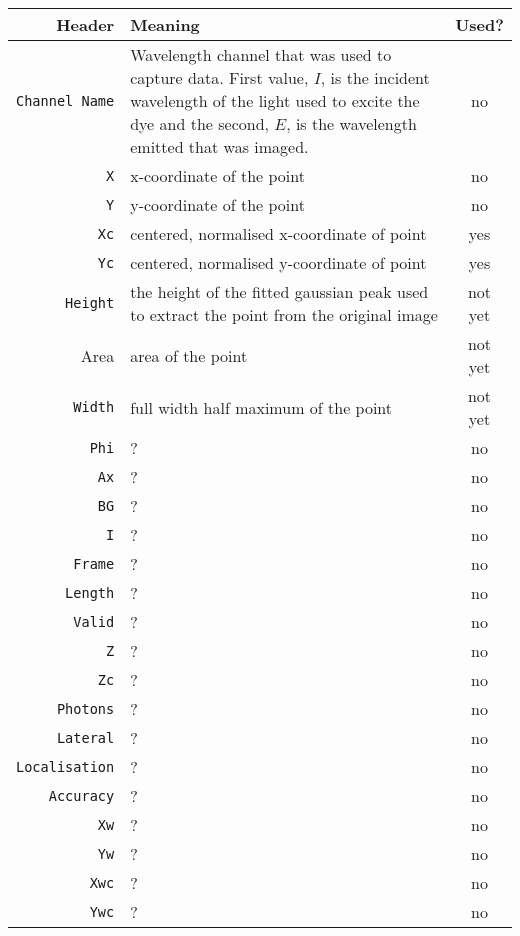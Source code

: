 \begin{center}
	\begin{tabular}{r p{8cm} c}
		\toprule
		Header & Meaning & Used? \\
		\midrule
		\texttt{Channel Name} & Wavelength channel that was used to capture data.
			First value, $I$, is the incident wavelength of the light used to
			excite the dye and the second, $E$, is the wavelength emitted that
			was imaged. & no \\
		\texttt{X} & x-coordinate of the point & no \\
		\texttt{Y} & y-coordinate of the point & no \\
		\texttt{Xc} & centered, normalised x-coordinate of point & yes \\
		\texttt{Yc} & centered, normalised y-coordinate of point & yes \\
		\texttt{Height} & the height of the fitted gaussian peak used to
			extract the point from the original image & not yet \\
		Area & area of the point & not yet \\
		\texttt{Width} & full width half maximum of the point & not yet \\
		\texttt{Phi}          & ? & no \\
		\texttt{Ax}           & ? & no \\
		\texttt{BG}           & ? & no \\
		\texttt{I}            & ? & no \\
		\texttt{Frame}        & ? & no \\
		\texttt{Length}       & ? & no \\
		\texttt{Valid}        & ? & no \\
		\texttt{Z}            & ? & no \\
		\texttt{Zc}           & ? & no \\
		\texttt{Photons}      & ? & no \\
		\texttt{Lateral}      & ? & no \\
		\texttt{Localisation} & ? & no \\
		\texttt{Accuracy}     & ? & no \\
		\texttt{Xw}           & ? & no \\
		\texttt{Yw}           & ? & no \\
		\texttt{Xwc}          & ? & no \\
		\texttt{Ywc}          & ? & no \\
		\bottomrule
	\end{tabular}
\end{center}

